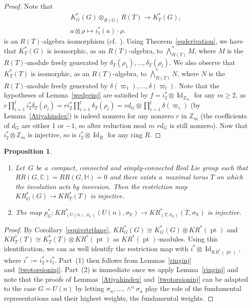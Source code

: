 \documentclass[11pt]{article}
\numberwithin{equation}{section}
\newtheorem{Proposition}[Theorem]{Proposition}
{\theoremstyle{definition}
\newtheorem{Definition}[Theorem]{Definition}
\newtheorem{Example}[Theorem]{Example}
\newtheorem{Remark}[Theorem]{Remark}
}
\DeclareMathOperator{\pt}{pt}
\DeclareMathOperator{\Id}{Id}
\begin{document}
\begin{proof}
Note that
\begin{gather*}
K_G^*(G)\otimes_{R(G)}R(T)  \to  K_T^*(G),
\\
a\otimes\rho  \mapsto  i_1^*(a)\cdot\rho.
\end{gather*}
is an $R(T)$-algebra isomorphism (cf.~\cite[Theorem~4.4]{HLS}).
Using Theorem~\ref{eqderivation}, we have that $K_T^*(G)$ is isomorphic, as an $R(T)$-algebra, to $\bigwedge_{R(T)}^*M$,
where $M$ is the $R(T)$-module freely generated by $\delta_T(\rho_1), \dots, \delta_T(\rho_l)$.
We also observe that $K_T^*(T)$ is isomorphic, as an $R(T)$-algebra, to $\bigwedge_{R(T)}^*N$, where $N$ is the
$R(T)$-module freely generated by $\delta(\varpi_1), \dots, \delta(\varpi_l)$.
Note that the hypotheses of Lemma~\ref{wedgeinj} are satisf\/ied by $f=i_2^*\otimes\Id_{\mathbb{Z}_m}$ for any
$m\geq 2$, as
$r\prod\limits_{i=1}^li_2^*\delta_T(\rho_i)=ri_2^*\prod\limits_{i=1}^l\delta_T(\rho_i)=rd_G\otimes\prod\limits_{i=1}^l\delta(\varpi_i)$
(by Lemma~\ref{Atiyahindex}) is indeed nonzero for any nonzero $r$ in $\mathbb{Z}_m$ (the coef\/f\/icients of $d_G$ are
either 1 or $-1$, so after reduction mod $m$ $rd_G$ is still nonzero).
Now that $i_2^*\otimes\mathbb{Z}_m$ is injective, so is $i_2^*\otimes\Id_R$ for any ring $R$.
\end{proof}

\begin{Proposition}\label{pginjective}{\samepage\quad
\begin{enumerate}\itemsep=0pt
\item[$1.$]
Let~$G$ be a~compact, connected and simply-connected Real Lie group such that $RR(G, \mathbb{C})=RR(G, \mathbb{H})=0$
and there exists a~maximal torus $T$ on which the involution acts by inversion.
Then the restriction map
$KR_{G}^*(G)\to KR_T^*(T)$
is injective.
\item[$2.$]
The map $p_G^*: KR_{(U(n),
\sigma_\mathbb{R})}^*(U(n),
\sigma_\mathbb{R})\to KR_{(T,
\sigma_\mathbb{R})}^*(T,
\sigma_\mathbb{R})$ is injective.
\end{enumerate}}
\end{Proposition}

\begin{proof}
By Corollary~\ref{equivstrthmg}, $KR^*_G(G)\cong K^*_G(G)\otimes KR^*(\pt)$ and $KR_T^*(T)\cong K^*_T(T)\otimes
KR^*(\pt)$ as $KR^*(\pt)$-modules.
Using this identif\/ication, we can as well identify the restriction map with $i^*\otimes\Id_{KR^*(\pt)}$,
where $i^*:=i_2^*\circ i_1^*$.
Part~(1) then follows from Lemmas~\ref{ringinj} and~\ref{twotorsioninj}.
Part~(2) is immediate once we apply Lemma~\ref{ringinj} and note that the proofs of Lemmas~\ref{Atiyahindex}
and~\ref{twotorsioninj} can be adapted to the case $G=U(n)$ by letting $\sigma_n, \dots, \wedge^n\sigma_n$
play the role of the fundamental representations and their highest weights, the
fundamental weights.
\end{proof}
\end{document}
